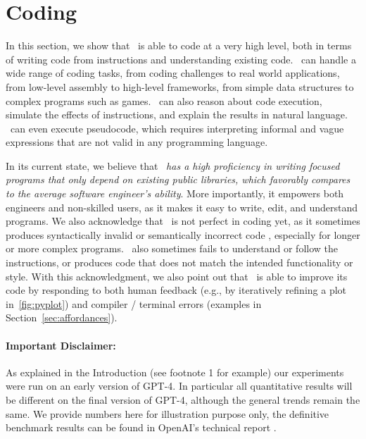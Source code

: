 \newpage
\section{Coding}
\label{sec:code}
\vspace{-3mm}
In this section, we show that \DV\ is able to code at a very high level, both in terms of writing code from instructions and understanding existing code. \DV\ can handle a wide range of coding tasks, from coding challenges to real world applications, from low-level assembly to high-level frameworks, from simple data structures to complex programs such as games. \DV\ can also reason about code execution, simulate the effects of instructions, and explain the results in natural language. \DV\ can even execute pseudocode, which requires interpreting informal and vague expressions that are not valid in any programming language.

In its current state, we believe that \DV\ \textit{has a high proficiency in writing focused programs that only depend on existing public libraries, which favorably compares to the average software engineer's ability}. More importantly, it empowers both engineers and non-skilled users, as it makes it easy to write, edit, and understand programs. We also acknowledge that \DV\ is not perfect in coding yet, as it sometimes produces syntactically invalid or semantically incorrect code%
, especially for longer or more complex programs. \DV\ also sometimes fails to understand or follow the instructions, or produces code that does not match the intended functionality or style. 
With this acknowledgment, we also point out that \DV\ is able to improve its code by responding to both human feedback (e.g., by iteratively refining a plot in~\ref{fig:pyplot}) and compiler / terminal errors (examples in Section~\ref{sec:affordances}).
\vspace{-4mm}
\paragraph{Important Disclaimer:} As explained in the Introduction (see footnote 1 for example) our experiments were run on an early version of GPT-4. In particular all quantitative results will be different on the final version of GPT-4, although the general trends remain the same. We provide numbers here for illustration purpose only, the definitive benchmark results can be found in OpenAI's technical report \cite{gpt4}.
\vspace{-2mm}

